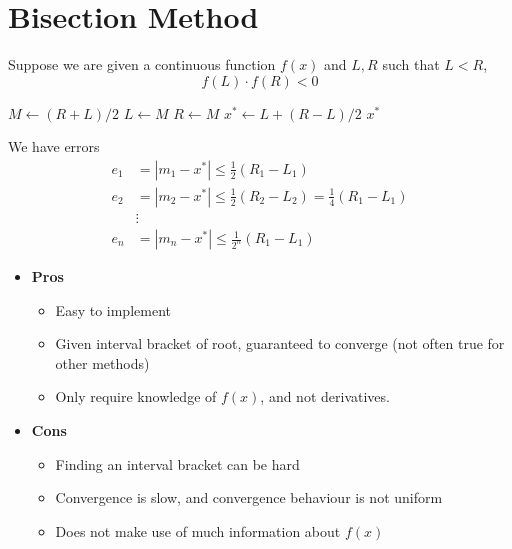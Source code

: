 \section{Bisection Method}

Suppose we are given a continuous function \( f(x) \) and \( L, R \) such that \( L < R \), \[
    f(L) \cdot f(R) < 0
\]

\begin{algorithm}[H]
    \begin{algorithmic}[1]
        \State \( M \gets (R + L) / 2 \)
        \State \( L \gets M \)
        \Else
        \State \( R \gets M \)
        \EndIf
        \EndWhile
        \State \( x^\ast \gets L + (R - L) / 2 \)
        \State \Return \( x^\ast \)
    \end{algorithmic}
\end{algorithm}

We have errors \begin{align*}
    e_1 & = | m_1 - x^\ast | \leq \frac{1}{2} ( R_1 - L_1 )
    \\
    e_2 & = | m_2 - x^\ast | \leq \frac{1}{2} ( R_2 - L_2 )
    = \frac{1}{4} ( R_1 - L_1 )
    \\
        & \vdots
    \\
    e_n & = | m_n - x^\ast | \leq \frac{1}{2^n} ( R_1 - L_1 )
\end{align*}

\begin{itemize}
    \item \textbf{Pros}
          \begin{itemize}
              \item Easy to implement
              \item Given interval bracket of root, guaranteed to converge (not often true for other methods)
              \item Only require knowledge of \( f(x) \), and not derivatives.
          \end{itemize}

    \item \textbf{Cons}
          \begin{itemize}
              \item Finding an interval bracket can be hard
              \item Convergence is slow, and convergence behaviour is not uniform
              \item Does not make use of much information about \( f(x) \)
          \end{itemize}
\end{itemize}


